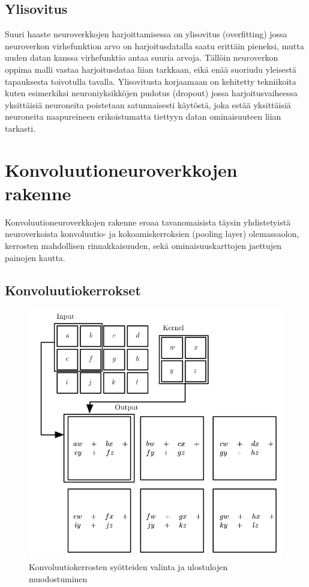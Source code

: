 \documentclass[finnish]{tktltiki2}
\theoremstyle{definition}
\theoremstyle{remark}
\begin{document}
  \subsection{Ylisovitus}

  Suuri haaste neuroverkkojen harjoittamisessa on ylisovitus (overfitting) jossa neuroverkon virhefunktion arvo on harjoitusdatalla saatu erittäin pieneksi, mutta uuden datan kanssa virhefunktio antaa suuria arvoja. Tällöin neuroverkon oppima malli vastaa harjoitusdataa liian tarkkaan, eikä enää suoriudu yleisestä tapauksesta toivotulla tavalla. Ylisovitusta korjaamaan on kehitetty tekniikoita kuten esimerkiksi neuroniyksikköjen pudotus (dropout) jossa harjoitusvaiheessa yksittäisiä neuroneita poistetaan satunnaisesti käytöstä, joka estää yksittäisiä neuroneita naapureineen erikoistumatta tiettyyn datan ominaisuuteen liian tarkasti.

  \section{Konvoluutioneuroverkkojen rakenne}
    Konvoluutioneuroverkkojen rakenne eroaa tavanomaisista täysin yhdistetyistä neuroverkoista konvoluutio- ja kokoamiskerroksien (pooling layer) olemassaolon, kerrosten mahdollisen rinnakkaisuuden, sekä ominaisuuskarttojen jaettujen painojen kautta.   
    
    \subsection{Konvoluutiokerrokset}
    
    \begin{figure}[h]
    \label{pic:convolution}
    \centering
    \includegraphics[scale=0.4]{convolution}
    \caption{Konvoluutiokerrosten syötteiden valinta ja ulostulojen muodostuminen \cite{Goodfellow-et-al-2016}}
    \end{figure}
\end{document}
